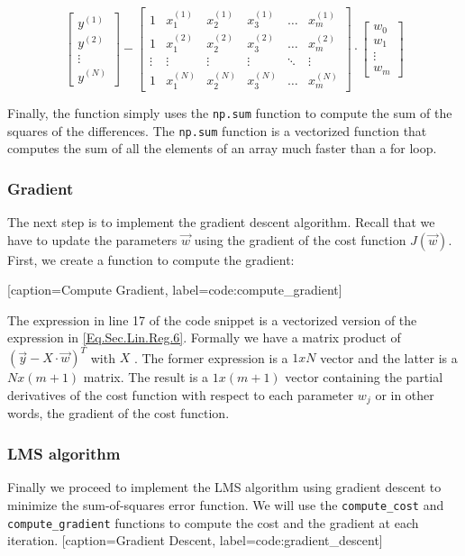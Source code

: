 \[ 
\begin{bmatrix} y^{(1)} \\ y^{(2)} \\ \vdots \\ y^{(N)}\end{bmatrix} - \begin{bmatrix}  
	1 & x_{1}^{(1)} & x_{2}^{(1)} & x_{3}^{(1)} & \dots  & x_{m}^{(1)} \\
	1 & x_{1}^{(2)} & x_{2}^{(2)} & x_{3}^{(2)} & \dots  & x_{m}^{(2)} \\
	\vdots & \vdots & \vdots & \vdots & \ddots & \vdots \\
	1 & x_{1}^{(N)} & x_{2}^{(N)} & x_{3}^{(N)} & \dots  & x_{m}^{(N)}
\end{bmatrix} \cdot \begin{bmatrix} w_0 \\ w_1 \\ \vdots \\ w_m \end{bmatrix} 
\]

Finally, the function simply uses the \texttt{np.sum} function to compute the sum of the squares of the differences. The \texttt{np.sum} function is a vectorized function that computes the sum of all the elements of an array much faster than a for loop.  

\subsubsection*{Gradient}
The next step is to implement the gradient descent algorithm. Recall that we have to update the parameters $\vec{w}$ using the gradient of the cost function $J(\vec{w})$. First, we create a function to compute the gradient:

[caption={Compute Gradient}, label={code:compute_gradient}]

\begin{remark}
	The expression in line 17 of the code snippet is a vectorized version of the expression in \cref{Eq.Sec.Lin.Reg.6}. Formally we have a matrix product of $(\vec{y}- X\cdot \vec{w})^T$ with $X$ . The former expression is a $1xN$ vector and the latter is a $Nx(m+1)$ matrix.  The result is a $1x(m+1)$ vector containing the partial derivatives of the cost function with respect to each parameter $w_j$ or in other words, the gradient of the cost function.
\end{remark}

\subsubsection*{LMS algorithm} 
Finally we proceed to implement the LMS algorithm using gradient descent to minimize the sum-of-squares error function. We will use the \texttt{compute\_cost} and \texttt{compute\_gradient} functions to compute the cost and the gradient at each iteration. 
[caption={Gradient Descent}, label={code:gradient_descent}]

